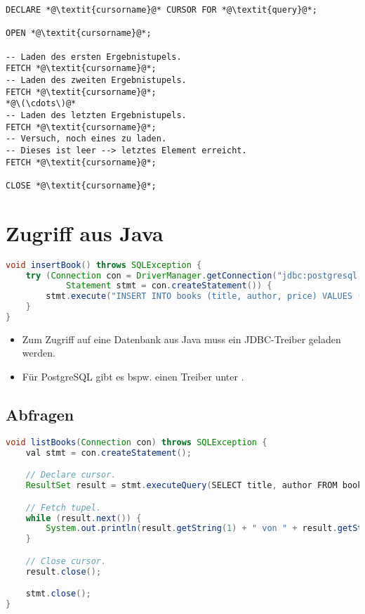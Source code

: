     	\begin{lstlisting}
DECLARE *@\textit{cursorname}@* CURSOR FOR *@\textit{query}@*;

OPEN *@\textit{cursorname}@*;

-- Laden des ersten Ergebnistupels.
FETCH *@\textit{cursorname}@*;
-- Laden des zweiten Ergebnistupels.
FETCH *@\textit{cursorname}@*;
*@\(\cdots\)@*
-- Laden des letzten Ergebnistupels.
FETCH *@\textit{cursorname}@*;
-- Versuch, noch eines zu laden.
-- Dieses ist leer --> letztes Element erreicht.
FETCH *@\textit{cursorname}@*;

CLOSE *@\textit{cursorname}@*;
    	\end{lstlisting}

    \section{Zugriff aus Java} %
        \begin{lstlisting}[language = Java]
void insertBook() throws SQLException {
	try (Connection con = DriverManager.getConnection("jdbc:postgresql://user:password@localhost:3306/library");
			Statement stmt = con.createStatement()) {
		stmt.execute("INSERT INTO books (title, author, price) VALUES ('Java ist auch eine Insel', 'Christian Ullenboom', 4990)");
	}
}
        \end{lstlisting}
        
        \begin{itemize}
        	\item Zum Zugriff auf eine Datenbank aus Java muss ein JDBC-Treiber geladen werden.
        	\item Für PostgreSQL gibt es bspw. einen Treiber unter .
        \end{itemize}

        \subsection{Abfragen} %
            \begin{lstlisting}[language = Java]
void listBooks(Connection con) throws SQLException {
	val stmt = con.createStatement();

	// Declare cursor.
	ResultSet result = stmt.executeQuery(SELECT title, author FROM books)

	// Fetch tupel.
	while (result.next()) {
		System.out.println(result.getString(1) + " von " + result.getString(2));
	}

	// Close cursor.
	result.close();

	stmt.close();
}
            \end{lstlisting}

